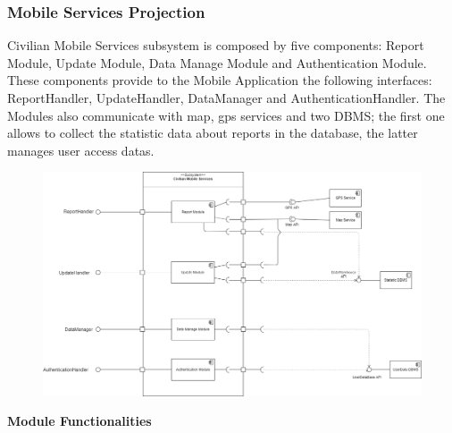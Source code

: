 \documentclass[12pt,a4paper]{article}
\begin{document}
\subsubsection{Mobile Services Projection}
Civilian Mobile Services subsystem is composed by five components: Report Module, Update Module, Data Manage Module and Authentication Module.
These components provide to the Mobile Application the following interfaces: ReportHandler, UpdateHandler, DataManager and AuthenticationHandler. The Modules also communicate with map, gps services and two DBMS; the first one allows to collect the statistic data about reports in the database, the latter manages user access datas.
\begin{figure}[H]
		\centering
			\includegraphics[width=1.0\linewidth]{Images/CivilianMobileServicesProjection}
\end{figure}
\textbf{Module Functionalities}
\end{document}

